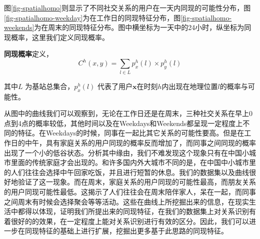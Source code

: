 图\ref{fig-spatialhomo}则显示了不同社交关系的用户在一天内同现的可能性分布，图\ref{fig-spatialhomo-weekday}为在工作日的同现特征分布，图\ref{fig-spatialhomo-weekends}为在周末的同现特征分布。图中横坐标为一天中的24小时，纵坐标为同现概率，这里我们定义同现概率。



\begin{definition}
    \label{spatial-homo-concept}
    \textbf{同现概率}定义，
    \begin{equation}
        C^{h}(x,y) = \sum_{l \in L}p_{x}^{h}(l) \times p_{y}^{h}(l)
    \end{equation}
\end{definition}


其中$L$ 为基站总集合，$p_{x}^{h}(l)$ 代表了用户$\bm{x}$在时刻$h$内出现在地理位置$l$的概率与可能性。

从图中的曲线我们可以观察到，无论在工作日还是在周末，三种社交关系在早上0点到4点的概率较低，其他时间以及在Weekdays和Weekends都呈现一定程度上不同的特征。在Weekdays的时候，同事在一起比其它关系的可能性要高。但是在工作日的中午，具有家庭关系的用户同现的概率反而增加了，而同事之间同现的概率出现了一个小的低谷状态。分析其中缘由，我们不难发现这个现象只有在中国小城市里面的传统家庭才会出现的。和许多国内外大城市不同的是，在中国中小城市里的人们往往会选择中午回家吃饭，并且进行短暂的休息。我们的数据集以及曲线很好地验证了这一现象。而在周末，家庭关系的用户同现的可能性最高，而朋友关系的用户同现可能性最低。这揭示了人们往往会在周末陪伴家人，呆在一起，而同事之间周末有时候会选择聚会等等活动。这些在曲线上所挖掘出来的信息，在现实生活中都得以体现，证明我们所提出来的同现特征，在我们的数据集上对关系识别有着很好的的效果，在一定程度上能对关系识别进行有效的区分。因此，我们可以进一步在同现特征的基础上进行扩展，挖掘出更多基于此思路的同现特征。



